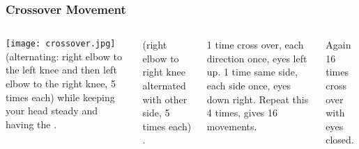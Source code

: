 \begin{frame}
\frametitle{Crossover Movement}


\begin{columns}[c] %

\texttt{[image: crossover.jpg]}
\textbf<1, 4>{} (alternating: right elbow to the left knee and then left elbow to the right knee, 5 times each) while keeping your head steady and having the . \pause

\textbf<2, 4>{} (right elbow to right knee alternated with other side, 5 times each) . \pause

\textbf<3, 4>{} 1 time cross over, each direction once, eyes left up. 1 time same side, each side once, eyes down right. Repeat this 4 times, gives 16 movements. \pause
 
\textbf<4>{} Again 16 times cross over with eyes closed.

\end{columns}
\end{frame}
